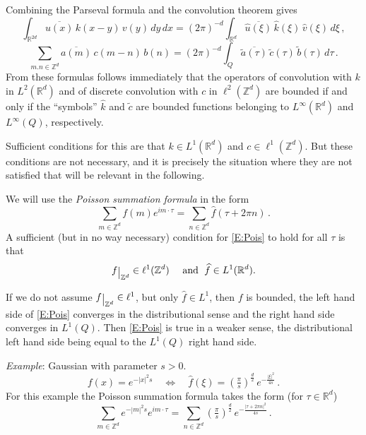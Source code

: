 \documentclass[12pt]{amsart}
\theoremstyle{definition}
\theoremstyle{remark}
\numberwithin{equation}{section}
\newcommand{\on}[1]{\raise-.5ex\hbox{\big|}_{#1}}
\newcommand\R{{\mathbb R}}
\newcommand\Z{{\mathbb Z}}
\let\hat=\widehat
\begin{document}
Combining the Parseval formula and the convolution theorem gives
\begin{equation}
\label{E:Par+conv,int}
\int_{\R^{2d}}\overline{u(x)}\,k(x-y)\,v(y)\,dy\,dx
= (2\pi)^{-d}\int_{\R^{d}}\overline{\hat u(\xi)}\,\hat k(\xi)\,\hat v(\xi)\,d\xi\,,
\end{equation}
\begin{equation}
\label{E:Par+conv,series}
\sum_{m.n\in\Z^{d}}\overline{a(m)}\,c(m-n)\,b(n) = 
(2\pi)^{-d} \int_{Q}\overline{\tilde{a}(\tau)}\,\tilde c(\tau) \,\tilde b(\tau)\, d\tau\,.
\end{equation}
From these formulas follows immediately that the operators of convolution with $k$ in $L^{2}(\R^{d})$ and of discrete convolution with $c$ in $\ell^{2}(\Z^{d})$ are bounded if and only if the ``symbols'' $\hat k$ and $\tilde c$ are bounded functions belonging to $L^{\infty}(\R^{d})$ and $L^{\infty}(Q)$, respectively. 

Sufficient conditions for this are that $k\in L^{1}(\R^{d})$ and $c\in\ell^{1}(\Z^{d})$. But these conditions are not necessary, and it is precisely the situation where they are not satisfied that will be relevant in the following.

We will use the \emph{Poisson summation formula} in the form
\begin{equation}
\label{E:Pois}
\sum_{m\in\Z^{d}} f(m) e^{im\cdot \tau} =
\sum_{n\in\Z^{d}} \hat f(\tau+2\pi n)\,.
\end{equation}
A sufficient (but in no way necessary) condition for \eqref{E:Pois} to hold for all $\tau$ is that 
$$
 f\on{\Z^{d}}\in\ell^{1}(\Z^{d})\quad \mbox{ and }\; \hat f\in L^{1}(\R^{d}).
$$ 

If we do not assume $f\on{\Z^{d}}\in\ell^{1}$, but only $\hat f\in L^{1}$, then $f$ is bounded, the left hand side of \eqref{E:Pois} converges in the distributional sense and the right hand side converges in $L^{1}(Q)$. Then
\eqref{E:Pois} is true in a weaker sense, the distributional left hand side being equal to the $L^{1}(Q)$ right hand side. 

\emph{Example}: Gaussian with parameter $s>0$.
\begin{equation}
\label{E:FGauss}
 f(x) = e^{-|x|^{2}s} \quad\Longleftrightarrow\quad
 \hat f(\xi)= (\tfrac\pi s)^{\frac d2} \,e^{-\frac{|\xi|^{2}}{4s}}\,.
\end{equation}
For this example the Poisson summation formula takes the form (for $\tau\in\R^{d}$)
\begin{equation}
\label{E:PGauss}
\sum_{m\in\Z^{d}} e^{-|m|^{2}s} e^{im\cdot \tau} =
\sum_{n\in\Z^{d}} (\tfrac\pi s)^{\frac d2} \,e^{-\frac{|\tau+2\pi n|^{2}}{4s}}\,.
\end{equation}
\end{document}
